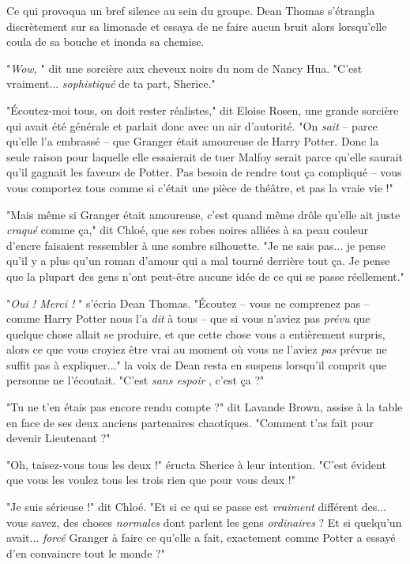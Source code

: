 Ce qui provoqua un bref silence au sein du groupe. Dean Thomas s'étrangla discrètement sur sa limonade et essaya de ne faire aucun bruit alors lorsqu'elle coula de sa bouche et inonda sa chemise.

"\emph{Wow,} " dit une sorcière aux cheveux noirs du nom de Nancy Hua. "C'est vraiment... \emph{sophistiqué}  de ta part, Sherice."

"Écoutez-moi tous, on doit rester réalistes," dit Eloise Rosen, une grande sorcière qui avait été générale et parlait donc avec un air d'autorité. "On \emph{sait}  – parce qu'elle l'a embrassé – que Granger était amoureuse de Harry Potter. Donc la seule raison pour laquelle elle essaierait de tuer Malfoy serait parce qu'elle saurait qu'il gagnait les faveurs de Potter. Pas besoin de rendre tout ça compliqué – vous vous comportez tous comme si c'était une pièce de théâtre, et pas la vraie vie !"

"Mais même si Granger était amoureuse, c'est quand même drôle qu'elle ait juste \emph{craqué}  comme ça," dit Chloé, que ses robes noires alliées à sa peau couleur d'encre faisaient ressembler à une sombre silhouette. "Je ne sais pas... je pense qu'il y a plus qu'un roman d'amour qui a mal tourné derrière tout ça. Je pense que la plupart des gens n'ont peut-être aucune idée de ce qui se passe réellement."

"\emph{Oui ! Merci !} " s'écria Dean Thomas. "Écoutez – vous ne comprenez pas – comme Harry Potter nous l'a \emph{dit}  à tous – que si vous n'aviez pas \emph{prévu}  que quelque chose allait se produire, et que cette chose vous a entièrement surpris, alors ce que vous croyiez être vrai au moment où vous ne l'aviez \emph{pas}  prévue ne suffit pas à expliquer..." la voix de Dean resta en suspens lorsqu'il comprit que personne ne l'écoutait. "C'est \emph{sans espoir} , c'est ça ?"

"Tu ne t'en étais pas encore rendu compte ?" dit Lavande Brown, assise à la table en face de ses deux anciens partenaires chaotiques. "Comment t'as fait pour devenir Lieutenant ?"

"Oh, taisez-vous tous les deux !" éructa Sherice à leur intention. "C'est évident que vous les voulez tous les trois rien que pour vous deux !"

"Je suis sérieuse !" dit Chloé. "Et si ce qui se passe est \emph{vraiment}  différent des... vous savez, des choses \emph{normales}  dont parlent les gens \emph{ordinaires}  ? Et si quelqu'un avait... \emph{forcé } Granger à faire ce qu'elle a fait, exactement comme Potter a essayé d'en convaincre tout le monde ?"

